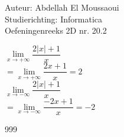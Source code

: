 \documentclass[a4paper]{article}
\begin{document}
  
\noindent \large Auteur: Abdellah El Moussaoui \\
\noindent \large Studierichting: Informatica\\
\noindent \large Oefeningenreeks 2D nr. 20.2\\

\medskip

\normalsize


$\lim\limits_{x \rightarrow +\infty} \dfrac{2\left |x \right | + 1}{x}$\\

$ = \lim\limits_{x \rightarrow +\infty} \dfrac{2x + 1}{x} = 2$\\

$\lim\limits_{x \rightarrow -\infty} \dfrac{2\left |x \right | + 1}{x}$\\

$ = \lim\limits_{x \rightarrow -\infty} \dfrac{-2x + 1}{x} = -2$\\


\begin{thebibliography}{999}
\end{thebibliography}
\end{document}

